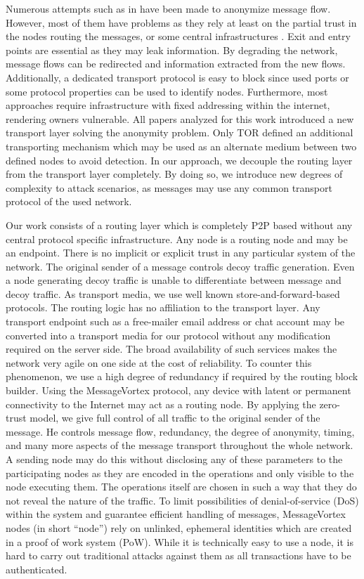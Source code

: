 \documentclass[runningheads]{llncs}
\begin{document}
Numerous attempts such as in \cite{minion-design,babel,mixmaster-spec,tor-design,freehaven-berk,herbivore:tr} have been made to anonymize message flow. However, most of them have problems as they rely at least on the partial trust in the nodes routing the messages, or some central infrastructures \cite{hs-attack06,esorics13-cellflood,esorics12-torscan,oakland2013-trawling}. Exit and entry points are essential as they may leak information. By degrading the network, message flows can be redirected and information extracted from the new flows. Additionally, a dedicated transport protocol is easy to block since used ports or some protocol properties can be used to identify nodes. Furthermore, most approaches require infrastructure with fixed addressing within the internet, rendering owners vulnerable. All papers analyzed for this work introduced a new transport layer solving the anonymity problem. Only TOR defined an additional transporting mechanism which may be used as an alternate medium between two defined nodes to avoid detection. In our approach, we decouple the routing layer from the transport layer completely. By doing so, we introduce new degrees of complexity to attack scenarios, as messages may use any common transport protocol of the used network. 

Our work consists of a routing layer which is completely P2P based without any central protocol specific infrastructure. Any node is a routing node and may be an endpoint. There is no implicit or explicit trust in any particular system of the  network. The original sender of a message controls decoy traffic generation. Even a node generating decoy traffic is unable to differentiate between message and decoy traffic. As transport media, we use well known store-and-forward-based protocols. The routing logic has no affiliation to the transport layer. Any transport endpoint such as a free-mailer email address or chat account may be converted into a transport media for our protocol without any modification required on the server side. The broad availability of such services makes the network very agile on one side at the cost of reliability. To counter this phenomenon, we use a high degree of redundancy if required by the routing block builder. Using the MessageVortex protocol, any device with latent or permanent connectivity to the Internet may act as a routing node. By applying the zero-trust model, we give full control of all traffic to the original sender of the message. He controls message flow, redundancy, the degree of anonymity, timing, and many more aspects of the message transport throughout the whole network. A sending node may do this without disclosing any of these parameters to the participating nodes as they are encoded in the operations and only visible to the node executing them. The operations itself are chosen in such a way that they do not reveal the nature of the traffic. To limit possibilities of denial-of-service (DoS) within the system and guarantee efficient handling of messages, MessageVortex nodes (in short ``node'') rely on unlinked, ephemeral identities which are created in a proof of work system (PoW). While it is technically easy to use a node, it is hard to carry out traditional attacks against them as all transactions have to be authenticated. 
\end{document}
